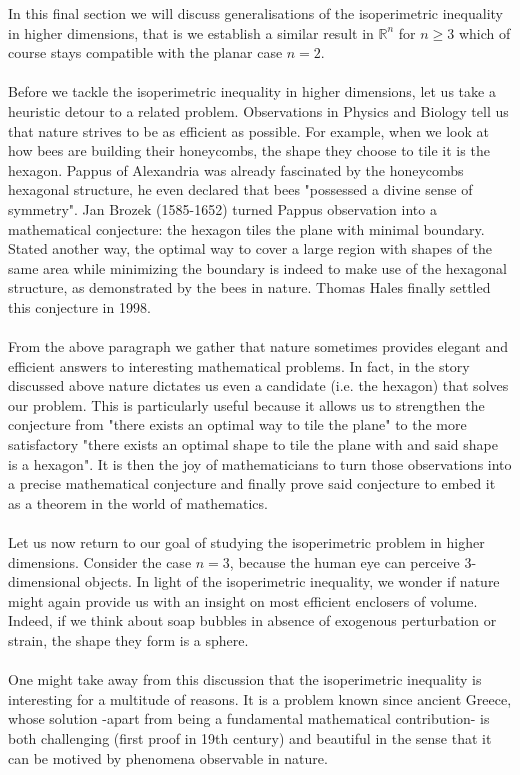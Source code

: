 \documentclass[12pt, a4paper, titlepage]{article}
\begin{document}
In this final section we will discuss generalisations of the isoperimetric inequality in higher dimensions, that is we establish a similar result in $\mathbb{R}^n$ for $n \geq 3$ which of course stays compatible with the planar case $n=2$. 
\\\\
Before we tackle the isoperimetric inequality in higher dimensions, let us take a heuristic detour to a related problem. Observations in Physics and Biology tell us that nature strives to be as efficient as possible. For example, when we look at how bees are building their honeycombs, the shape they choose to tile it is the hexagon. Pappus of Alexandria was already fascinated by the honeycombs hexagonal structure, he even declared that bees "possessed a divine sense of symmetry". Jan Brozek (1585-1652) turned Pappus observation into a mathematical conjecture: the hexagon tiles the plane with minimal boundary. Stated another way, the optimal way to cover a large region with shapes of the same area while minimizing the boundary is indeed to make use of the hexagonal structure, as demonstrated by the bees in nature. Thomas Hales finally settled this conjecture in 1998.
\\\\
From the above paragraph we gather that nature sometimes provides elegant and efficient answers to interesting mathematical problems. In fact, in the story discussed above nature dictates us even a candidate (i.e. the hexagon) that solves our problem. This is particularly useful because it allows us to strengthen the conjecture from "there exists an optimal way to tile the plane" to the more satisfactory "there exists an optimal shape to tile the plane with and said shape is a hexagon". It is then the joy of mathematicians to turn those observations into a precise mathematical conjecture and finally prove said conjecture to embed it as a theorem in the world of mathematics. 
\\\\
Let us now return to our goal of studying the isoperimetric problem in higher dimensions. Consider the case $n=3$, because the human eye can perceive $3$-dimensional objects. In light of the isoperimetric inequality, we wonder if nature might again provide us with an insight on most efficient enclosers of volume. Indeed, if we think about soap bubbles in absence of exogenous perturbation or strain, the shape they form is a sphere. 
\\\\
One might take away from this discussion that the isoperimetric inequality is interesting for a multitude of reasons. It is a problem known since ancient Greece, whose solution -apart from being a fundamental mathematical contribution- is both challenging (first proof in 19th century) and beautiful in the sense that it can be motived by phenomena observable in nature.
\end{document}
